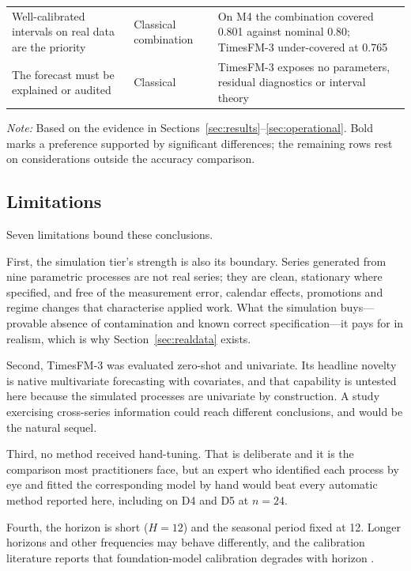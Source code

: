 \documentclass[article]{ajs}
\providecommand{\sectionref}[1]{Section~\ref{#1}}
\begin{document}
\begin{table}[!htbp]
\begin{threeparttable}
\begin{tabular}{>{\raggedright\arraybackslash}p{5.5cm}>{\raggedright\arraybackslash}p{3.0cm}>{\raggedright\arraybackslash}p{5.0cm}}
Well-calibrated intervals on real data are the priority
  & Classical combination
  & On M4 the combination covered 0.801 against nominal 0.80; TimesFM-3 under-covered at
    0.765 \\[2pt]
The forecast must be explained or audited
  & Classical
  & TimesFM-3 exposes no parameters, residual diagnostics or interval theory \\
\bottomrule
\end{tabular}
\begin{tablenotes}[flushleft]\footnotesize
\item \textit{Note:} Based on the evidence in Sections~\ref{sec:results}--\ref{sec:operational}.
Bold marks a preference supported by significant differences; the remaining rows rest on
considerations outside the accuracy comparison.
\end{tablenotes}
\end{threeparttable}
\end{table}

\subsection{Limitations}
\label{sec:limitations}

Seven limitations bound these conclusions.

First, the simulation tier's strength is also its boundary. Series generated from nine
parametric processes are not real series; they are clean, stationary where specified, and free
of the measurement error, calendar effects, promotions and regime changes that characterise
applied work. What the simulation buys---provable absence of contamination and known correct
specification---it pays for in realism, which is why \sectionref{sec:realdata} exists.

Second, TimesFM-3 was evaluated zero-shot and univariate. Its headline novelty is native
multivariate forecasting with covariates, and that capability is untested here because the
simulated processes are univariate by construction. A study exercising cross-series information
could reach different conclusions, and would be the natural sequel.

Third, no method received hand-tuning. That is deliberate and it is the comparison most
practitioners face, but an expert who identified each process by eye and fitted the
corresponding model by hand would beat every automatic method reported here, including on D4
and D5 at $n = 24$.

Fourth, the horizon is short ($H = 12$) and the seasonal period fixed at 12. Longer horizons
and other frequencies may behave differently, and the calibration literature reports that
foundation-model calibration degrades with horizon \citep{adler2026calibrated}.
\end{document}
